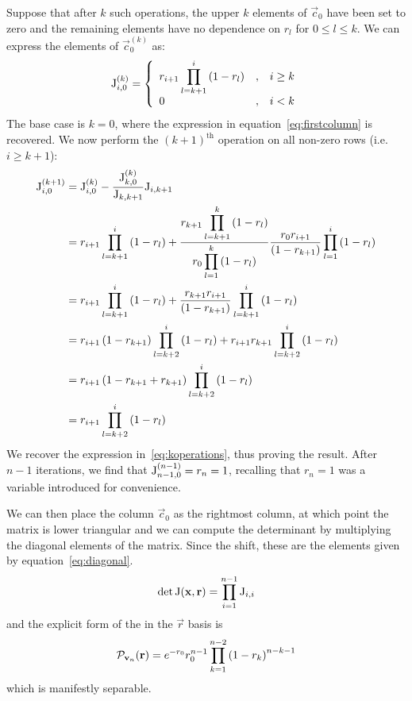 Suppose that after \(k\) such operations, the upper \(k\) elements of
\(\vec{c}_{0}\) have been set to zero and the remaining elements have no
dependence on \(r_{l}\) for \(0 \leq l \leq k\). We can express the elements of
\(\vec{c}_{0}^{\left(k\right)}\) as:
\begin{equation}
  \label{eq:koperations}
  \mathrm{J}_{i,0}^{\left(k\right)} = \left\{ \begin{array}{lcl}
    r_{i+1} \displaystyle \prod_{l=k+1}^{i} \left( 1-r_{l} \right) & , &
      i \geq k \\
    0 & , & i < k
  \end{array} \right.
\end{equation}
The base case is \(k=0\), where the expression in equation~\ref{eq:firstcolumn}
is recovered. We now perform the \(\left(k+1\right)^{
\text{th}}\) operation on all non-zero rows (i.e.\ \(i \geq k+1\)):
\begin{align}
  \mathrm{J}_{i,0}^{\left(k+1\right)} &= \mathrm{J}_{i,0}^{\left(k\right)} - 
    \frac{\mathrm{J}_{k,0}^{\left(k\right)}}{\mathrm{J}_{k,k+1}} \mathrm{J}_{i,k+1} \\
  &= r_{i+1}\prod_{l=k+1}^{i} \left( 1-r_{l} \right) + \frac{\displaystyle
    r_{k+1} \prod_{
    l=k+1}^{k} \left( 1-r_{l} \right) }{\displaystyle r_{0} \prod_{l=1}^{k}
    \left( 1-r_{l} \right) } \frac{ r_{0} r_{i+1} }{ \left( 1-r_{k+1} \right) }
    \prod_{ l=1 }^{i} \left( 1-r_{l} \right) \\
  &= r_{i+1} \prod_{l=k+1}^{i} \left( 1-r_{l} \right) + \frac{ r_{k+1} r_{i+1}
    }{ \left( 1-r_{k+1} \right) } \prod_{l=k+1}^{i} \left( 1-r_{l} \right) \\
  &= r_{i+1} \left( 1-r_{k+1} \right) \prod_{l=k+2}^{i} \left( 1-r_{l} \right)
    + r_{i+1} r_{k+1} \prod_{l=k+2}^{i} \left( 1-r_{l} \right) \\
  &= r_{i+1} \left( 1-r_{k+1}+r_{k+1} \right) \prod_{l=k+2}^{i} \left( 1-r_{l}
    \right) \\
  &= r_{i+1} \prod_{l=k+2}^{i} \left( 1-r_{l} \right)
\end{align}
We recover the expression in~\ref{eq:koperations}, thus proving the result.
After \(n-1\) iterations, we find that \(\mathrm{J}_{n-1,0}^{\left(n-1\right)}=
r_{n}=1\), recalling that \(r_{n}=1\) was a variable introduced for convenience.

We can then place the column \(\vec{c}_{0}\) as the rightmost column, at which
point the matrix is lower triangular and we can compute the determinant by
multiplying the diagonal elements of the matrix. Since the shift, these are the
elements given by equation~\ref{eq:diagonal}.
\begin{equation}
  \det \mathrm{J} \!\left( \mathbf{x}, \mathbf{r} \right) = \prod_{i=1}^{n-1} \mathrm{J}_{i,i}
\end{equation}
and the explicit form of the \pdf{} in the \(\vec{r}\) basis is
\begin{equation}
  \mathcal{P}_{\mathbf{v}_n} \!\left( \mathbf{r} \right) = e^{-r_0} r_0^{n-1} \prod_{k=1}^{n-2}
  \left( 1-r_k \right)^{n-k-1}
\end{equation}
which is manifestly separable.

